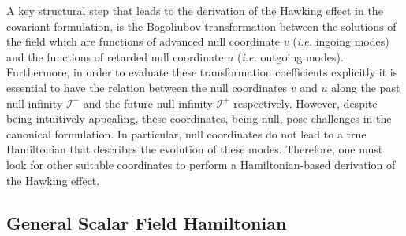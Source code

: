 \documentclass[aps,12pt,showpacs]{revtex4-2}
\def\scriplus{\mathscr{I}^{+}}
\def\scriminus{\mathscr{I}^{-}}
\begin{document}
A key structural step that leads to the derivation of the Hawking effect in the 
covariant formulation, is the Bogoliubov transformation between the solutions of 
the field which are functions of advanced null coordinate $v$ (\emph{i.e.} 
ingoing modes) and the functions of retarded null coordinate $u$ (\emph{i.e.} 
outgoing modes). Furthermore, in order to evaluate these transformation 
coefficients explicitly it is essential to have the relation between the null 
coordinates $v$ and $u$ along the past null infinity $\scriminus$ and the future 
null infinity $\scriplus$ respectively. However, despite being intuitively 
appealing, these coordinates, being null, pose challenges in the canonical 
formulation. In particular, null coordinates do not lead to a true Hamiltonian 
that describes the evolution of these modes. Therefore, one must look for other 
suitable coordinates to perform a Hamiltonian-based derivation of the Hawking 
effect.



\subsection{General Scalar Field Hamiltonian}
\end{document}
